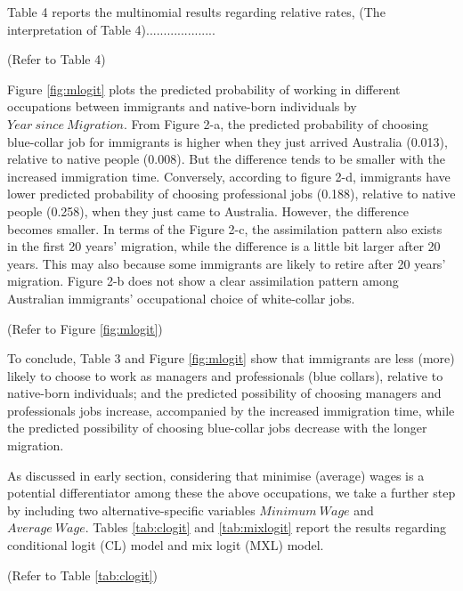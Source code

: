 Table 4 reports the multinomial results regarding relative rates, (The interpretation of Table 4)....................

\begin{center}
(Refer to Table 4)
\end{center}

Figure \ref{fig:mlogit} plots the predicted probability of working in different occupations between immigrants and native-born individuals by $\mathit{Year\ since\ Migration}$.
From Figure 2-a, the predicted probability of choosing blue-collar job for immigrants is higher when they just arrived Australia (0.013), relative to native people (0.008).
But the difference tends to be smaller with the increased immigration time.
Conversely, according to figure 2-d, immigrants have lower predicted probability of choosing professional jobs (0.188), relative to native people (0.258), when they just came to Australia.
However, the difference becomes smaller.
In terms of the Figure 2-c, the assimilation pattern also exists in the first 20 years’ migration, while the difference is a little bit larger after 20 years.
This may also because some immigrants are likely to retire after 20 years’ migration.
Figure 2-b does not show a clear assimilation pattern among Australian immigrants’ occupational choice of white-collar jobs.

\begin{center}
(Refer to Figure \ref{fig:mlogit})
\end{center}

To conclude, Table 3 and Figure \ref{fig:mlogit} show that immigrants are less (more) likely to choose to work as managers and professionals (blue collars), relative to native-born individuals; and the predicted possibility of choosing managers and professionals jobs increase, accompanied by the increased immigration time, while the predicted possibility of choosing blue-collar jobs decrease with the longer migration.

As discussed in early section, considering that minimise (average) wages is a potential differentiator among these the above occupations, we take a further step by including two alternative-specific variables $\mathit{Minimum\ Wage}$ and $\mathit{Average\ Wage}$.
Tables \ref{tab:clogit} and \ref{tab:mixlogit} report the results regarding conditional logit (CL) model and mix logit (MXL) model.

\begin{center}
(Refer to Table \ref{tab:clogit})
\end{center}


